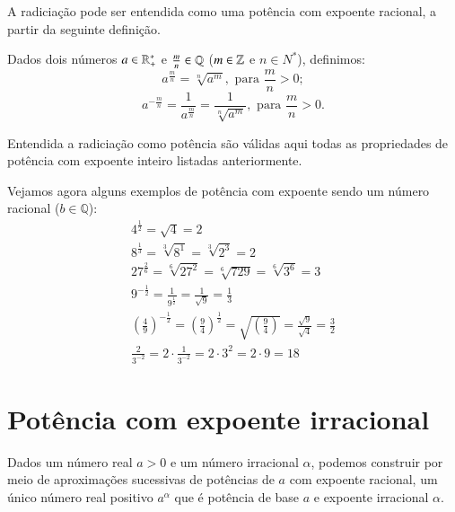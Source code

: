  A radiciação pode ser entendida como uma potência com expoente racional, a partir da seguinte definição.
 \vskip0.3cm

 \colorbox{azul}{
 \begin{minipage}{0.9\linewidth}
 \begin{center}
  Dados dois números $a \in \mathbb{R}^{*}_{+}$ e $\frac{m}{n} \in \mathbb{Q}$ ($m \in \mathbb{Z}$ e $n \in N^{*}$), definimos:
 \[a^{\frac{m}{n}}= \sqrt[n]{a^m}, \text{ para } \frac{m}{n} >0 ;\]
 \[a^{-\frac{m}{n}}= \frac{1}{a^{\frac{m}{n}}}= \frac{1}{\sqrt[n]{a^m}},  \text{ para } \frac{m}{n} >0.\]
 \end{center}
 \end{minipage}}

 \vskip0.3cm
 
 Entendida a radiciação como potência são válidas aqui todas as propriedades de potência com expoente inteiro listadas anteriormente.

 \begin{exem}
  Vejamos agora alguns exemplos de potência com expoente sendo um número racional ($b \in \mathbb{Q}$):
  \begin{eqnarray*}
   4^{\frac{1}{2}}= \sqrt{4}= 2 \\
   8^{\frac{1}{3}}= \sqrt[3]{8^1}= \sqrt[3]{2^{3}}= 2 \\
   27^{\frac{2}{6}}= \sqrt[6]{27^2}= \sqrt[6]{729}= \sqrt[6]{3^6}= 3\\
   9^{-\frac{1}{2}}= \frac{1}{9^{\frac{1}{2}}}= \frac{1}{\sqrt{9}}= \frac{1}{3} \\
   \left(\frac{4}{9}\right)^{-\frac{1}{2}}= \left(\frac{9}{4}\right)^{\frac{1}{2}}= \sqrt{\left(\frac{9}{4}\right)}=\frac{\sqrt{9}}{\sqrt{4}}= \frac{3}{2} \\
   \frac{2}{3^{-2}}= 2 \cdot \frac{1}{3^{-2}}= 2 \cdot 3^{2}= 2 \cdot 9= 18
  \end{eqnarray*}

 \end{exem}
 
 \section{Potência com expoente irracional}
 
 Dados um número real $a > 0$ e um número irracional $\alpha$, podemos construir por meio de aproximações sucessivas de potências de $a$ com expoente racional, um único número real positivo $a^{\alpha}$ que é potência de base $a$ e expoente irracional $\alpha$.
 
